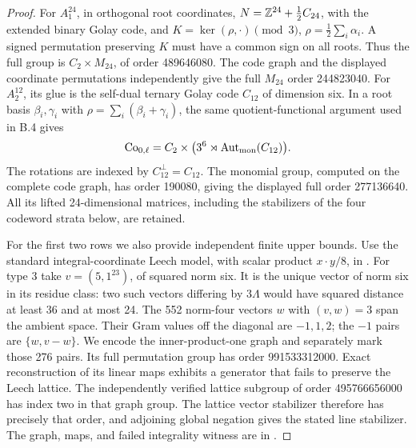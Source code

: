 \begin{proof}
For \(A_1^{24}\), in orthogonal root coordinates,
\(N=\mathbb Z^{24}+\tfrac12 C_{24}\), with the extended binary Golay
code, and \(K=\ker(\rho,{\cdot})\pmod3\),
\(\rho=\tfrac12\sum_i\alpha_i\). A signed permutation preserving
\(K\) must have a common sign on all roots. Thus the full group is
\(C_2\times M_{24}\), of order 489646080. The code graph and the
displayed coordinate permutations independently give the full
\(M_{24}\) order 244823040.
For \(A_2^{12}\), its glue is the self-dual ternary Golay code
\(C_{12}\) of dimension six. In a root basis
\(\beta_i,\gamma_i\) with \(\rho=\sum_i(\beta_i+\gamma_i)\),
the same quotient-functional argument used in B.4 gives
\[
 \mathrm{Co}_{0,\ell}
   =C_2\times\bigl(3^6\rtimes
           \operatorname{Aut}_{\rm mon}(C_{12})\bigr).
\]
The rotations are indexed by \(C_{12}^{\perp}=C_{12}\). The
monomial group, computed on the complete code graph, has order
190080, giving the displayed full order 277136640. All its lifted
24-dimensional matrices, including the stabilizers of the four
codeword strata below, are retained.

For the first two rows we also provide independent finite upper
bounds. Use the standard integral-coordinate Leech model, with
scalar product \(x\cdot y/8\), in
. For type 3 take
\(v=(5,1^{23})\), of squared norm six. It is the unique vector of
norm six in its residue class: two such vectors differing by
\(3\Lambda\) would have squared distance at least 36 and at most
24. The 552 norm-four vectors \(w\) with \((v,w)=3\) span the
ambient space. Their Gram values off the diagonal are \(-1,1,2\);
the \(-1\) pairs are \(\{w,v-w\}\). We encode the inner-product-one
graph and separately mark those 276 pairs. Its full permutation
group has order 991533312000. Exact reconstruction of its linear
maps exhibits a generator that fails to preserve the Leech lattice.
The independently verified lattice subgroup of order 495766656000
has index two in that graph group. The lattice vector stabilizer
therefore has precisely that order, and adjoining global negation
gives the stated line stabilizer. The graph, maps, and failed
integrality witness are in .


\end{proof}
